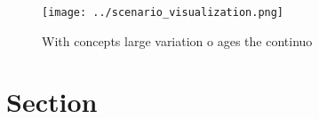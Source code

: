 \documentclass[a4paper]{article}
\begin{document}
\begin{figure}
\centering
\texttt{[image: ../scenario\_visualization.png]}
\caption{With concepts large variation o ages the continuo
}
\end{figure}
 
\section{Section}
\end{document}
